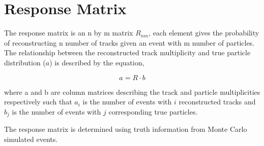 \section{Response Matrix}
\label{section: response matrix}

The response matrix is an n by m matrix $R_{nm}$, each element gives the probability of reconstructing n number of tracks given an event with m number of particles. The relationship between the reconstructed track multiplicity  and true particle distribution ($a$) is described by the equation,

\begin{equation}
	a = R \cdot b
\end{equation} 

where a and b are column matrices describing the track and particle multiplicities respectively such that $a_i$ is the number of events with $i$ reconstructed tracks and $b_j$ is the number of events with $j$ corresponding true particles.

The response matrix is determined using truth information from Monte Carlo simulated events. 

